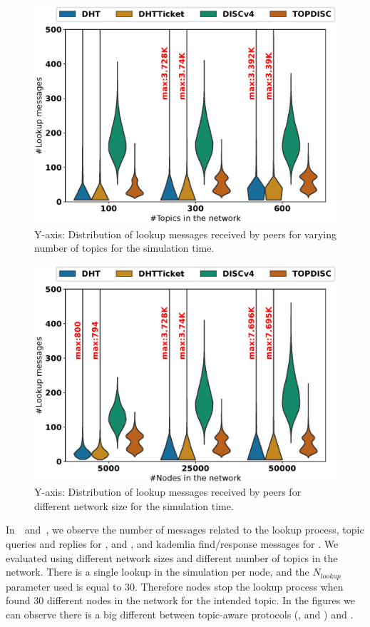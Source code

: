 \begin{figure}
\centering
\includegraphics[width=\linewidth]{results/efficiency/violin_topic_lookupMsgs.eps}
\caption{Y-axis: Distribution of lookup messages received by peers for varying number of topics for the simulation time.}
\label{fig:lookupMsgPerTopic}
\end{figure}

\begin{figure}[!h]
\centering
\includegraphics[width=\linewidth]{results/efficiency/violin_size_lookupMsgs.eps}
\caption{Y-axis: Distribution of lookup messages received by peers for different network size for the simulation time.}
\label{fig:lookupMsgPerSize}
\end{figure}

In~~and~, we observe the number of messages related to the lookup process, \ie topic queries and replies for \sysname, \altname and \altnameticket, and kademlia find/response messages for \discv. We evaluated using  different network sizes and different number of topics in the network. 
There is a single lookup in the simulation per node, and the $N_\textit{lookup}$ parameter used is equal to 30.  Therefore nodes stop the lookup process when found 30 different nodes in the network for the intended topic.
In the figures we can observe there is a big different between topic-aware protocols (\sysname, \altname and \altnameticket) and \discv. 

